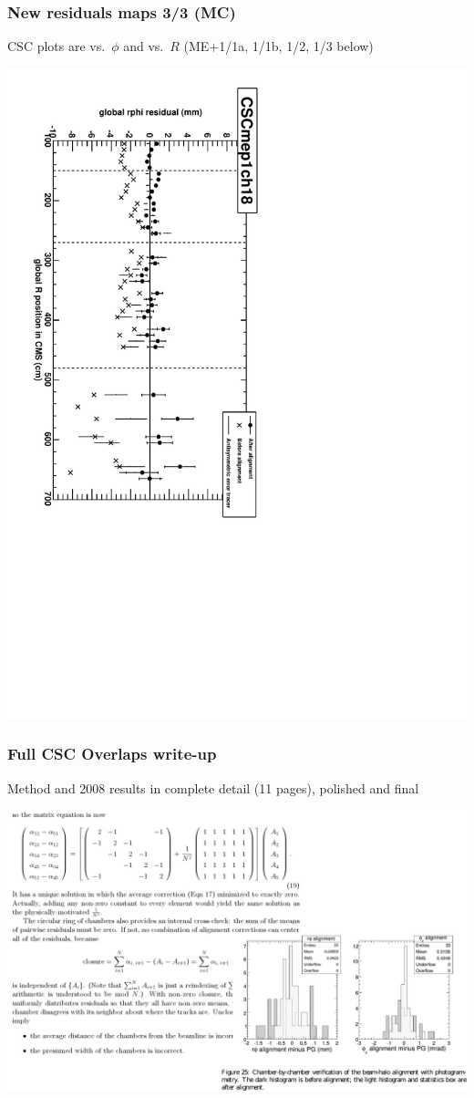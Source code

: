 \documentclass[compress]{beamer}
\begin{document}
\begin{frame}
\frametitle{New residuals maps 3/3 (MC)}

CSC plots are vs.\ $\phi$ and vs.\ $R$ (ME$+$1/1a, 1/1b, 1/2, 1/3 below)

\vfill
\includegraphics[height=\linewidth, angle=90]{examplemap_CSCrphi1.pdf}
\end{frame}

\begin{frame}
\frametitle{Full CSC Overlaps write-up}

Method and 2008 results in complete detail (11 pages), polished and final

\vfill
\includegraphics[width=\linewidth]{CSCoverlaps_writeup.pdf}
\end{frame}
\end{document}
